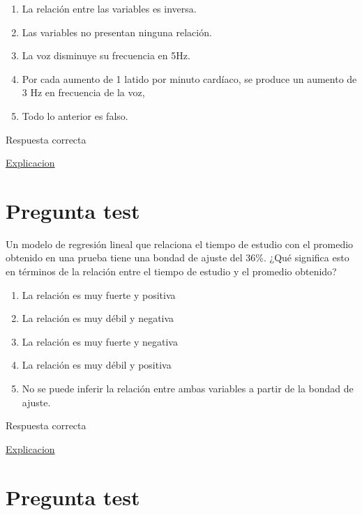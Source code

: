 \documentclass[
]{book}
\providecommand{\tightlist}{%
  \setlength{\itemsep}{0pt}\setlength{\parskip}{0pt}}
\begin{document}
\begin{enumerate}
\def\labelenumi{\alph{enumi})}
\tightlist
\item
  La relación entre las variables es inversa.
\item
  Las variables no presentan ninguna relación.
\item
  La voz disminuye su frecuencia en 5Hz.
\item
  Por cada aumento de 1 latido por minuto cardíaco, se produce un aumento de 3 Hz en frecuencia de la voz,
\item
  Todo lo anterior es falso.
\end{enumerate}

Respuesta correcta

\href{https://1fjmanzano.github.io/bioestadistica/relaci\%C3\%B3n-entre-variables-nume\%CC\%81ricas.html\#regresio\%CC\%81n-lineal}{Explicacion}

\hypertarget{pregunta-test-136}{%
\section{Pregunta test}\label{pregunta-test-136}}

Un modelo de regresión lineal que relaciona el tiempo de estudio con el promedio obtenido en una prueba tiene una bondad de ajuste del 36\%. ¿Qué significa esto en términos de la relación entre el tiempo de estudio y el promedio obtenido?

\begin{enumerate}
\def\labelenumi{\alph{enumi})}
\tightlist
\item
  La relación es muy fuerte y positiva
\item
  La relación es muy débil y negativa
\item
  La relación es muy fuerte y negativa
\item
  La relación es muy débil y positiva
\item
  No se puede inferir la relación entre ambas variables a partir de la bondad de ajuste.
\end{enumerate}

Respuesta correcta

\href{https://blog.minitab.com/es/analisis-de-regresion-como-puedo-interpretar-el-r-cuadrado-y-evaluar-la-bondad-de-ajuste}{Explicacion}

\hypertarget{pregunta-test-137}{%
\section{Pregunta test}\label{pregunta-test-137}}
\end{document}

